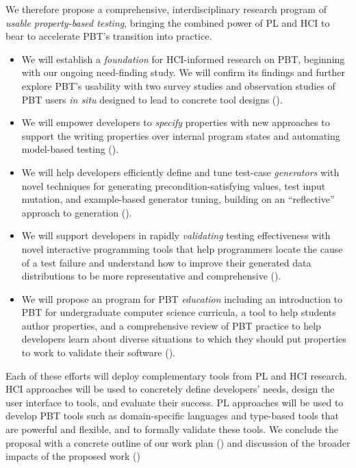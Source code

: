 We therefore propose a comprehensive, interdisciplinary research program of \emph{usable
property-based testing}, bringing the combined power of PL and HCI to bear to
accelerate PBT's transition into practice.
\begin{itemize}[noitemsep]
\item We will establish a \emph{foundation} for HCI-informed research on PBT,
beginning with our ongoing need-finding study. We will confirm
its findings and further explore PBT's usability with
two\iflater{}\fi{} survey studies and observation studies
of PBT users {\em in situ} designed to lead to concrete tool designs
().
  \item We will empower developers to \emph{specify} properties with new approaches
to support the writing properties over internal program states and
automating model-based testing ().
  \item We will help developers efficiently define and tune test-case
\emph{generators} with novel techniques for generating precondition-satisfying
values, test input mutation, and example-based generator tuning, building
  on an ``reflective'' approach to generation ().
  \item We will support developers in rapidly \emph{validating} testing
  effectiveness with novel interactive programming tools that help programmers
locate the cause of a test failure and understand how to improve their generated
data distributions to be more representative and comprehensive
().
  \item We will propose an program for PBT \emph{education} including
  an introduction to PBT for undergraduate
  computer science curricula, a tool to help students author
  properties, and a comprehensive review of PBT practice
  to help developers learn about diverse situations to which they should
  put properties to work to validate their software
  ().
\end{itemize}

Each of these efforts will deploy complementary tools from PL
and HCI research. HCI approaches will be used to concretely define developers' needs,
design the user interface to tools, and evaluate their success. PL approaches
will be used to develop PBT tools such as domain-specific languages and
type-based tools that are powerful and flexible, and to formally validate these
tools. We conclude the proposal with a concrete outline of our work plan
() and discussion of the broader impacts of the
proposed work ()

